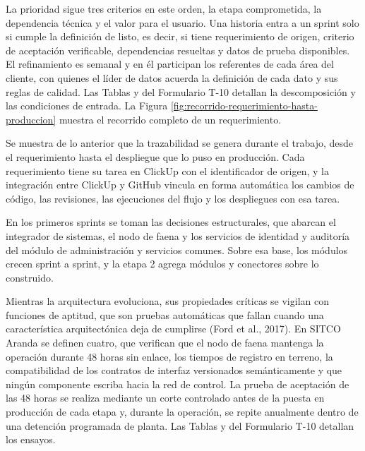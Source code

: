 \documentclass[subdoc]{../../comun/overfore}
\begin{document}
La prioridad sigue tres criterios en este orden, la etapa comprometida, la dependencia técnica y el valor para el usuario. Una historia entra a un sprint solo si cumple la definición de listo, es decir, si tiene requerimiento de origen, criterio de aceptación verificable, dependencias resueltas y datos de prueba disponibles. El refinamiento es semanal y en él participan los referentes de cada área del cliente, con quienes el líder de datos acuerda la definición de cada dato y sus reglas de calidad. Las Tablas  y  del Formulario T-10 detallan la descomposición y las condiciones de entrada. La Figura \ref{fig:recorrido-requerimiento-hasta-produccion} muestra el recorrido completo de un requerimiento.

Se muestra de lo anterior que la trazabilidad se genera durante el trabajo, desde el requerimiento hasta el despliegue que lo puso en producción. Cada requerimiento tiene su tarea en ClickUp con el identificador de origen, y la integración entre ClickUp y GitHub vincula en forma automática los cambios de código, las revisiones, las ejecuciones del flujo y los despliegues con esa tarea.

En los primeros sprints se toman las decisiones estructurales, que abarcan el integrador de sistemas, el nodo de faena y los servicios de identidad y auditoría del módulo de administración y servicios comunes. Sobre esa base, los módulos crecen sprint a sprint, y la etapa 2 agrega módulos y conectores sobre lo construido.

Mientras la arquitectura evoluciona, sus propiedades críticas se vigilan con funciones de aptitud, que son pruebas automáticas que fallan cuando una característica arquitectónica deja de cumplirse (Ford et al., 2017). En SITCO Aranda se definen cuatro, que verifican que el nodo de faena mantenga la operación durante 48 horas sin enlace, los tiempos de registro en terreno, la compatibilidad de los contratos de interfaz versionados semánticamente y que ningún componente escriba hacia la red de control. La prueba de aceptación de las 48 horas se realiza mediante un corte controlado antes de la puesta en producción de cada etapa y, durante la operación, se repite anualmente dentro de una detención programada de planta. Las Tablas  y  del Formulario T-10 detallan los ensayos.
\end{document}
